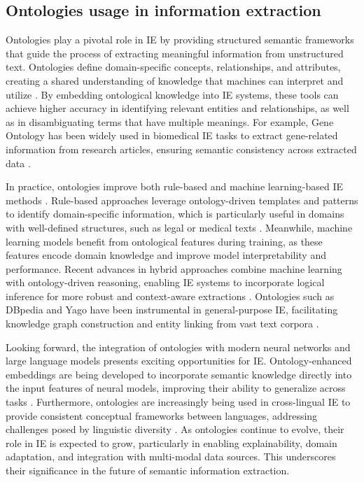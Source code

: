 \documentclass{article}
\begin{document}
\subsection{Ontologies usage in information extraction}
\par
Ontologies play a pivotal role in IE by providing structured semantic frameworks that guide the process of extracting meaningful information from unstructured text. 
Ontologies define domain-specific concepts, relationships, and attributes, creating a shared understanding of knowledge that machines can interpret and utilize \citep{1993.TO.WIA}. 
By embedding ontological knowledge into IE systems, these tools can achieve higher accuracy in identifying relevant entities and relationships, as well as in disambiguating terms that have multiple meanings. 
For example, Gene Ontology has been widely used in biomedical IE tasks to extract gene-related information from research articles, ensuring semantic consistency across extracted data \citep{2000.MI.GOT, 2016.FE.AHO, 2021.GO.AOF}.  
\par
In practice, ontologies improve both rule-based and machine learning-based IE methods \citep{2025.SD.ARO}. 
Rule-based approaches leverage ontology-driven templates and patterns to identify domain-specific information, which is particularly useful in domains with well-defined structures, such as legal or medical texts \citep{2021.BR.AON}. 
Meanwhile, machine learning models benefit from ontological features during training, as these features encode domain knowledge and improve model interpretability and performance. 
Recent advances in hybrid approaches combine machine learning with ontology-driven reasoning, enabling IE systems to incorporate logical inference for more robust and context-aware extractions \citep{2024.JG.ACA}. 
Ontologies such as DBpedia \citep{2007.SO.DAN} and Yago \citep{2008.FM.YAL} have been instrumental in general-purpose IE, facilitating knowledge graph construction and entity linking from vast text corpora \citep{2018.SO.TAK, 2020.DI.KG}.  
\par
Looking forward, the integration of ontologies with modern neural networks and large language models presents exciting opportunities for IE. 
Ontology-enhanced embeddings are being developed to incorporate semantic knowledge directly into the input features of neural models, improving their ability to generalize across tasks \citep{2022.NA.TAG}. 
Furthermore, ontologies are increasingly being used in cross-lingual IE to provide consistent conceptual frameworks between languages, addressing challenges posed by linguistic diversity \citep{2019.SH.FMT, 2013.JO.NLP, 2016.MA.ICO}. 
As ontologies continue to evolve, their role in IE is expected to grow, particularly in enabling explainability, domain adaptation, and integration with multi-modal data sources. 
This underscores their significance in the future of semantic information extraction.
\end{document}
